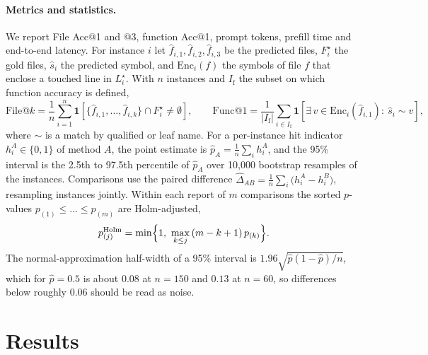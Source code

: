 \documentclass[10pt]{article}
\newcommand{\ind}[1]{\mathbf{1}\!\left[#1\right]}
\begin{document}
\paragraph{Metrics and statistics.} We report File Acc@1 and @3, function Acc@1, prompt tokens, prefill time and end-to-end latency. For instance $i$ let $\hat f_{i,1},\hat f_{i,2},\hat f_{i,3}$ be the predicted files, $F^\star_i$ the gold files, $\hat s_i$ the predicted symbol, and $\mathrm{Enc}_i(f)$ the symbols of file $f$ that enclose a touched line in $L^\star_i$. With $n$ instances and $I_{\mathrm f}$ the subset on which function accuracy is defined,
\begin{equation}\label{eq:acc}
\mathrm{File@}k=\frac1n\sum_{i=1}^{n}\ind{\{\hat f_{i,1},\dots,\hat f_{i,k}\}\cap F^\star_i\neq\emptyset},\qquad
\mathrm{Func@1}=\frac1{|I_{\mathrm f}|}\sum_{i\in I_{\mathrm f}}\ind{\exists\,v\in\mathrm{Enc}_i(\hat f_{i,1}):\ \hat s_i\sim v},
\end{equation}
where $\sim$ is a match by qualified or leaf name. For a per-instance hit indicator $h^A_i\in\{0,1\}$ of method $A$, the point estimate is $\hat p_A=\frac1n\sum_i h^A_i$, and the 95\% interval is the 2.5th to 97.5th percentile of $\hat p_A$ over 10{,}000 bootstrap resamples of the instances. Comparisons use the paired difference $\hat\Delta_{AB}=\frac1n\sum_i\bigl(h^A_i-h^B_i\bigr)$, resampling instances jointly. Within each report of $m$ comparisons the sorted $p$-values $p_{(1)}\le\dots\le p_{(m)}$ are Holm-adjusted,
\begin{equation}\label{eq:holm}
p^{\mathrm{Holm}}_{(j)}=\min\Bigl\{1,\ \max_{k\le j}\,(m-k+1)\,p_{(k)}\Bigr\}.
\end{equation}
The normal-approximation half-width of a 95\% interval is $1.96\sqrt{\hat p(1-\hat p)/n}$, which for $\hat p=0.5$ is about $0.08$ at $n=150$ and $0.13$ at $n=60$, so differences below roughly 0.06 should be read as noise.

\section{Results}
\end{document}
